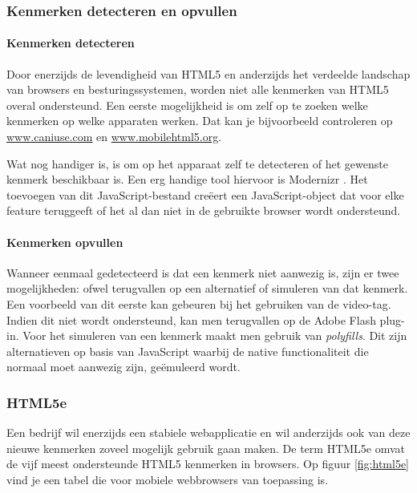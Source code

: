 \subsubsection{Kenmerken detecteren en opvullen}
\paragraph{Kenmerken detecteren} \cite{MacDonald2011}
Door enerzijds de levendigheid van HTML5 en anderzijds het verdeelde landschap van browsers en besturingssystemen, worden niet alle kenmerken van HTML5 overal ondersteund. Een eerste mogelijkheid is om zelf op te zoeken welke kenmerken op welke apparaten werken. Dat kan je bijvoorbeeld controleren op \url{www.caniuse.com} en \url{www.mobilehtml5.org}. 

Wat nog handiger is, is om op het apparaat zelf te detecteren of het gewenste kenmerk beschikbaar is. Een erg handige tool hiervoor is Modernizr \cite{Modernizr2012}. Het toevoegen van dit JavaScript-bestand creëert een JavaScript-object dat voor elke feature teruggeeft of het al dan niet in de gebruikte browser wordt ondersteund.

\paragraph{Kenmerken opvullen} \cite{MacDonald2011,Weyl2011}
Wanneer eenmaal gedetecteerd is dat een kenmerk niet aanwezig is, zijn er twee mogelijkheden: ofwel terugvallen op een alternatief of simuleren van dat kenmerk. Een voorbeeld van dit eerste kan gebeuren bij het gebruiken van de video-tag. Indien dit niet wordt ondersteund, kan men terugvallen op de Adobe Flash plug-in. Voor het simuleren van een kenmerk maakt men gebruik van \emph{polyfills}. Dit zijn alternatieven op basis van JavaScript waarbij de native functionaliteit die normaal moet aanwezig zijn, geëmuleerd wordt.

\subsubsection{HTML5e}
Een bedrijf wil enerzijds een stabiele webapplicatie en wil anderzijds ook van deze nieuwe kenmerken zoveel mogelijk gebruik gaan maken. De term HTML5e \cite{Hales2012} omvat de vijf meest ondersteunde HTML5 kenmerken in browsers. Op figuur \ref{fig:html5e} vind je een tabel die voor mobiele webbrowsers van toepassing is.

